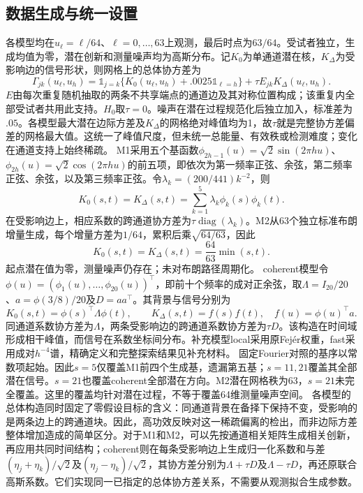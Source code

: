\subsection{数据生成与统一设置}
各模型均在$u_\ell=\ell/64$、$\ell=0,\ldots,63$上观测，最后时点为$63/64$。受试者独立，生成均值为零，潜在创新和测量噪声均为高斯分布。记$K_0$为单通道潜在核，$K_\Delta$为受影响边的信号形状，则网格上的总体协方差为
\[
\Gamma_{jk}(u_\ell,u_h)
=\mathbb 1_{j=k}\{K_0(u_\ell,u_h)+.0025\mathbb 1_{\ell=h}\}
+\tau E_{jk}K_\Delta(u_\ell,u_h).
\]
$E$由每次重复随机抽取的两条不共享端点的通道边及其对称位置构成；该重复内全部受试者共用此支持。$H_0$取$\tau=0$。噪声在潜在过程规范化后独立加入，标准差为$.05$。各模型最大潜在边际方差及$K_\Delta$的网格绝对峰值均为1，故$\tau$就是完整协方差偏差的网格最大值。这统一了峰值尺度，但未统一总能量、有效秩或检测难度；变化在通道支持上始终稀疏。
M1采用五个基函数$\phi_{2h-1}(u)=\sqrt2\sin(2\pi hu)$、$\phi_{2h}(u)=\sqrt2\cos(2\pi hu)$的前五项，即依次为第一频率正弦、余弦，第二频率正弦、余弦，以及第三频率正弦。令$\lambda_k=(200/441)k^{-2}$，则
\[K_0(s,t)=K_\Delta(s,t)=\sum_{k=1}^{5}\lambda_k\phi_k(s)\phi_k(t).\]
在受影响边上，相应系数的跨通道协方差为$\tau\operatorname{diag}(\lambda_k)$。M2从63个独立标准布朗增量生成，每个增量方差为$1/64$，累积后乘$\sqrt{64/63}$，因此
\[K_0(s,t)=K_\Delta(s,t)=\frac{64}{63}\min(s,t).\]
起点潜在值为零，测量噪声仍存在；未对布朗路径周期化。
coherent模型令$\phi(u)=(\phi_1(u),\ldots,\phi_{20}(u))^\top$，即前十个频率的成对正余弦，取$\Lambda=I_{20}/20$、$a=\phi(3/8)/20$及$D=aa^\top$。其背景与信号分别为
\[K_0(s,t)=\phi(s)^\top\Lambda\phi(t),\qquad
K_\Delta(s,t)=f(s)f(t),\quad f(u)=\phi(u)^\top a.\]
同通道系数协方差为$\Lambda$，两条受影响边的跨通道系数协方差为$\tau D$。该构造在时间域形成相干峰值，而信号在系数坐标间分布。补充模型local采用原Fejér权重，fast采用成对$h^{-4}$谱，精确定义和完整探索结果见补充材料。
固定Fourier对照的基序以常数项起始。因此$s=5$仅覆盖M1前四个生成基，遗漏第五基；$s=11,21$覆盖其全部潜在信号。$s=21$也覆盖coherent全部潜在方向。M2潜在网格秩为63，$s=21$未完全覆盖。这里的覆盖均针对潜在过程，不等于覆盖64维测量噪声空间。
各模型的总体构造同时固定了零假设目标的含义：同通道背景在备择下保持不变，受影响的是两条边上的跨通道块。因此，高功效反映对这一稀疏偏离的检出，而非边际方差整体增加造成的简单区分。对于M1和M2，可以先按通道相关矩阵生成相关创新，再应用共同时间结构；coherent则在每条受影响边上生成归一化系数和与差$(\eta_j+\eta_k)/\sqrt2$及$(\eta_j-\eta_k)/\sqrt2$，其协方差分别为$\Lambda+\tau D$及$\Lambda-\tau D$，再还原联合高斯系数。它们实现同一已指定的总体协方差关系，不需要从观测拟合生成参数。

